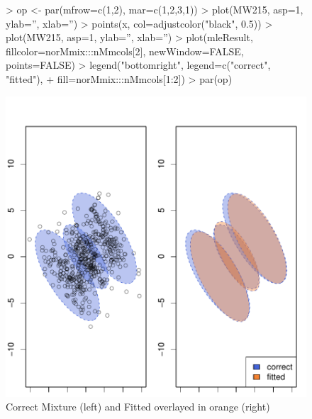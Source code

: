\begin{figure}[h]
    \begin{Rgraph}[0.9]
\begin{Schunk}
\begin{Sinput}
>     op <- par(mfrow=c(1,2), mar=c(1,2,3,1))
>     plot(MW215, asp=1, ylab='', xlab='')
>     points(x, col=adjustcolor("black", 0.5))
>     plot(MW215, asp=1, ylab='', xlab='')
>     plot(mleResult, fillcolor=norMmix:::nMmcols[2], newWindow=FALSE, points=FALSE)
>     legend("bottomright", legend=c("correct", "fitted"),
+            fill=norMmix:::nMmcols[1:2])
>     par(op)
\end{Sinput}
\end{Schunk}
\includegraphics{chapter2-testtt}
    \caption{Correct Mixture (left) and Fitted overlayed in orange (right)}
    \label{fig:democorfit}
    \end{Rgraph}
\end{figure}
